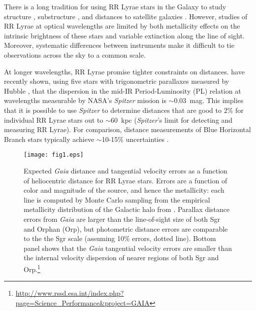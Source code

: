 \documentclass{emulateapj}
\begin{document}
There is a long tradition for using RR Lyrae stars in the Galaxy to
study structure 
\citep[e.g.][]{shapley18}, substructure
\citep[e.g.][]{sesar10}, and distances to satellite galaxies
\citep[e.g.][]{clementini03}.  However, studies of RR Lyrae at optical
wavelengths are limited by both metallicity effects on the intrinsic
brightness of these stars and variable extinction along the line of
sight.  Moreover, systematic differences between instruments make it
difficult to tie observations across the sky to a common scale. 

At longer wavelengths, RR Lyrae promise tighter constraints on
distances.  
\citet{madore12} have recently shown, 
using five stars with
trigonometric parallaxes measured by Hubble \citep{benedict11},
that the dispersion in the mid-IR Period-Luminosity (PL) relation 
\citep[first mapped by][]{longmore86}
at
wavelengths measurable by NASA's {\it Spitzer} mission is $\sim$0.03~mag.
This implies that it is
possible to use {\it Spitzer} to determine distances that are good to $2\%$ for 
individual RR Lyrae stars out to $\sim$60~kpc ({\it Spitzer}'s limit for detecting and measuring RR Lyrae).
For comparison, distance measurements of Blue Horizontal Branch
stars typically
achieve $\sim$10-15\% uncertainties  \citep[if appropriate color measurements are available, e.g.,][]{deason12b}.

\begin{figure}[h!]
\begin{center}
\texttt{[image: fig1.eps]}

\caption{Expected {\it Gaia} distance and tangential velocity errors as a function of heliocentric distance for RR Lyrae stars. Errors are a function of color and magnitude of the source, and hence the metallicity: each line is computed
by Monte Carlo sampling from the empirical metallicity distribution of
the Galactic halo from \cite{ivezic08}. Parallax distance errors from {\it Gaia} are larger than the line-of-sight size of both Sgr and Orphan (Orp), but photometric distance errors are comparable to the the Sgr scale (assuming 10\% errors, dotted line). Bottom panel shows that the {\it Gaia} tangential velocity errors are smaller than the internal velocity dispersion of nearer regions of both Sgr and Orp.\footnote{\url{http://www.rssd.esa.int/index.php?page=Science_Performance&project=GAIA}} }\label{fig:gaia_errors}
\end{center}
\end{figure}
\end{document}
